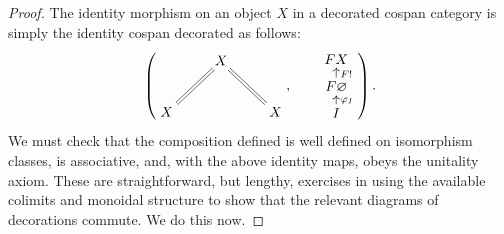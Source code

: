 \begin{proof}
  The identity morphism on an object $X$ in a decorated cospan category is
  simply the identity cospan decorated as follows:
  \[
    \left(
    \begin{aligned}
      \xymatrix{
	& X \\  
	X \ar@{=}[ur] && X \ar@{=}[ul]
      }
    \end{aligned}
    ,
    \qquad
    \begin{aligned}
      \xymatrixrowsep{.5pc}
      \xymatrix{
	FX \\
	F\varnothing \ar[u]_{F!} \\
	I \ar[u]_{\varphi_I}
      }
    \end{aligned}
    \right).
  \]
  We must check that the composition defined is well defined on isomorphism
  classes, is associative, and, with the above identity maps, obeys the
  unitality axiom. These are straightforward, but lengthy, exercises in
  using the available colimits and monoidal structure to show that
  the relevant diagrams of decorations commute. We do this now.


\end{proof}
